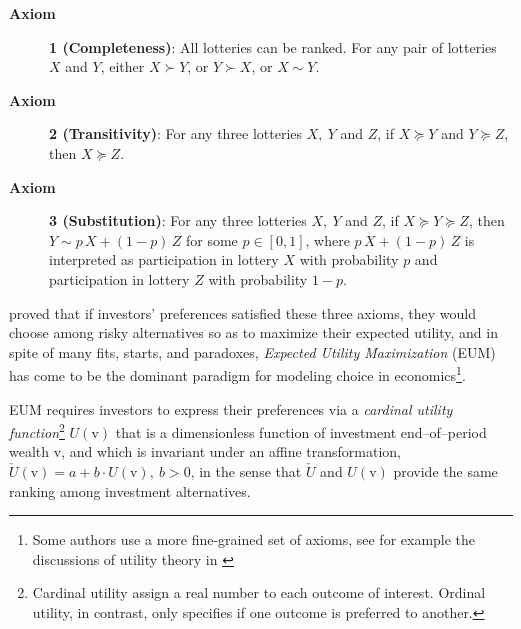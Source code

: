 \documentclass[graybox,envcountchap,sectrefs]{svmono}\usepackage[]{graphicx}\usepackage[]{xcolor}
\begin{document}
\begin{appendices}
\begin{description}
\item [{\textbf{Axiom}}] \textbf{1 (Completeness)}: All lotteries can be
ranked. For any pair of lotteries $X$ and $Y$, either $X\succ Y$,
or $Y\succ X$, or $X\sim Y$.
\item [{\textbf{Axiom}}] \textbf{2 (Transitivity)}: For any three lotteries
$X,\ Y$ and $Z$, if $X\succeq Y$ and $Y\succeq Z$, then $X\succeq Z$.
\item [{\textbf{Axiom}}] \textbf{3 (Substitution)}: For any three lotteries
$X,\ Y$ and $Z$, if $X\succeq Y\succeq Z$, then $Y\sim p\,X+(1-p)\,Z$
for some $p\in[0,1]$, where $p\,X+(1-p)\,Z$ is interpreted as participation
in lottery $X$ with probability $p$ and participation in lottery
$Z$ with probability $1-p$.
\end{description}
\citet{VonNeumann1947} proved that if investors' preferences satisfied
these three axioms, they would choose among risky alternatives so
as to maximize their expected utility, and in spite of many fits,
starts, and paradoxes, \emph{Expected Utility Maximization} (EUM)
has come to be the dominant paradigm for modeling choice in economics\footnote{Some authors use a more fine-grained set of axioms, see for example
the discussions of utility theory in \citet{Levy2016}}. 

EUM requires investors to express their preferences via a \emph{cardinal
utility function}\footnote{Cardinal utility assign a real number to each outcome of interest.
Ordinal utility, in contrast, only specifies if one outcome is preferred
to another.} $U(\mathit{\mathrm{v}})$ that is a dimensionless function of investment
end--of--period wealth $\mathit{\mathrm{v}}$, and which is invariant
under an affine transformation, $\check{U}(\mathit{\mathrm{v}})=a+b\cdot\mathit{U}(\mathit{\mathrm{v}}),\ b>0$,
in the sense that $\check{U}$ and $U(\mathit{\mathrm{v}})$ provide
the same ranking among investment alternatives. 


\end{appendices}
\end{document}
